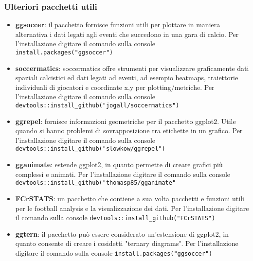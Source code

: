         \subsubsection{Ulteriori pacchetti utili}
            \begin{itemize}
                \item \textbf{ggsoccer}: il pacchetto fornisce funzioni utili per plottare in maniera alternativa i dati legati agli eventi che succedono in una gara di calcio. Per l'installazione digitare il comando sulla console \texttt{install.packages("ggsoccer")}
                \item \textbf{soccermatics}: soccermatics offre strumenti per visualizzare graficamente dati spaziali calcistici ed dati legati ad eventi, ad esempio heatmaps, traiettorie individuali di giocatori e coordinate x,y per plotting/metriche. Per l'installazione digitare il comando sulla console \texttt{devtools::install\_github("jogall/soccermatics")}
                \item \textbf{ggrepel}: fornisce informazioni geometriche per il pacchetto ggplot2. Utile quando si hanno problemi di sovrapposizione tra etichette in un grafico. Per l'installazione digitare il comando sulla console \texttt{devtools::install\_github("slowkow/ggrepel")}
                \item \textbf{gganimate}: estende ggplot2, in quanto permette di creare grafici più complessi e animati. Per l'installazione digitare il comando sulla console \\ \texttt{devtools::install\_github("thomasp85/gganimate"}
                \item \textbf{FCrSTATS}: un pacchetto che contiene a sua volta pacchetti e funzioni utili per le football analysis e la visualizzazione dei dati. Per l'installazione digitare il comando sulla console \texttt{devtools::install\_github("FCrSTATS")}
                \item \textbf{ggtern}: il pacchetto può essere considerato un'estensione di ggplot2, in quanto consente di creare i cosidetti "ternary diagrams". Per l'installazione digitare il comando sulla console \texttt{install.packages("ggsoccer")}
            \end{itemize}